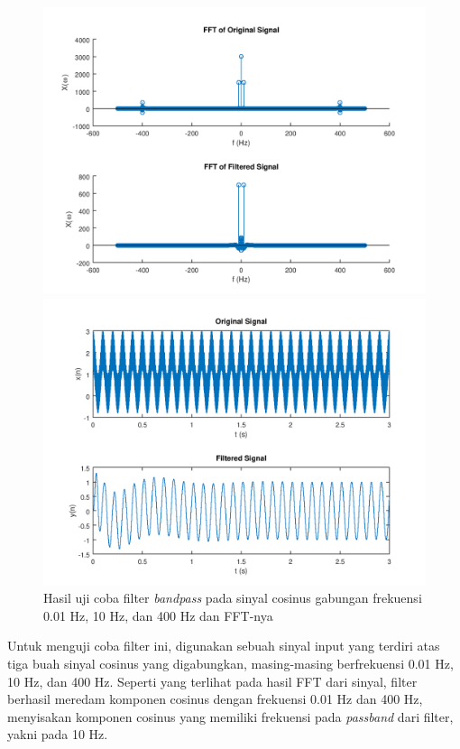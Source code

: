 \documentclass[11pt]{article}
\begin{document}
\begin{figure}[H]
\centerline{\includegraphics[scale=0.55]{figures/fig16-bpfcosspectrum.png}}
\centerline{\includegraphics[scale=0.55]{figures/fig15-bpfcostrial.png}}
\caption{Hasil uji coba filter \textit{bandpass} pada sinyal cosinus gabungan frekuensi 0.01 Hz, 10 Hz, dan 400 Hz dan FFT-nya}
\label{bpfcosresp}
\end{figure}

Untuk menguji coba filter ini, digunakan sebuah sinyal input yang terdiri atas tiga buah sinyal cosinus yang digabungkan, masing-masing berfrekuensi 0.01 Hz, 10 Hz, dan 400 Hz. Seperti yang terlihat pada hasil FFT dari sinyal, filter berhasil meredam komponen cosinus dengan frekuensi 0.01 Hz dan 400 Hz, menyisakan komponen cosinus yang memiliki frekuensi pada \textit{passband} dari filter, yakni pada 10 Hz. 
\end{document}
